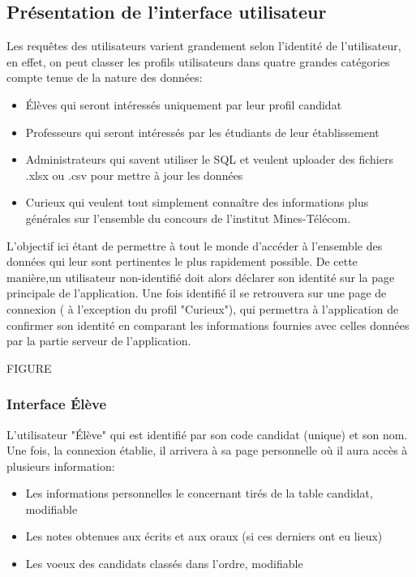  \subsection{Présentation de l'interface utilisateur}
 Les requêtes des utilisateurs varient grandement selon l'identité de l'utilisateur, en effet, on peut classer les profils utilisateurs dans quatre grandes catégories compte tenue de la nature des données:
\begin{itemize}
         \item Élèves qui seront intéressés uniquement par leur profil candidat
         \item Professeurs qui seront intéressés par les étudiants de leur établissement
         \item Administrateurs qui savent utiliser le SQL et veulent uploader des fichiers .xlsx ou .csv pour mettre à jour les données
         \item Curieux qui veulent tout simplement connaître des informations plus générales sur l'ensemble du concours de l'institut Mines-Télécom.
      \end{itemize}
L'objectif ici étant de permettre à tout le monde d'accéder à l'ensemble des données qui leur sont pertinentes le plus rapidement possible.
De cette manière,un utilisateur non-identifié doit alors déclarer son identité sur la page principale de l'application. Une fois identifié il se retrouvera sur une page de connexion ( à l'exception du profil "Curieux"), qui permettra à l'application de confirmer son identité en comparant les informations fournies avec celles données par la partie serveur de l'application.

FIGURE
\subsubsection{Interface Élève}
L'utilisateur "Élève" qui est identifié par son code candidat (unique) et son nom. Une fois, la connexion établie, il arrivera à sa page personnelle où il aura accès à plusieurs information:\\

\begin{itemize}
         \item Les informations personnelles le concernant tirés de la table candidat, modifiable
         \item Les notes obtenues aux écrits et aux oraux (si ces derniers ont eu lieux) 
         \item Les voeux des candidats classés dans l'ordre, modifiable

      \end{itemize}
